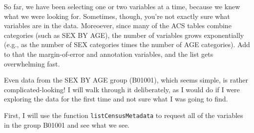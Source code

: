 \documentclass[openany]{book}
\newenvironment{Shaded}{\begin{snugshade}}{\end{snugshade}}
\newcommand{\CommentTok}[1]{\textcolor[rgb]{0.56,0.35,0.01}{\textit{#1}}}
\newcommand{\DataTypeTok}[1]{\textcolor[rgb]{0.13,0.29,0.53}{#1}}
\newcommand{\DecValTok}[1]{\textcolor[rgb]{0.00,0.00,0.81}{#1}}
\newcommand{\KeywordTok}[1]{\textcolor[rgb]{0.13,0.29,0.53}{\textbf{#1}}}
\newcommand{\NormalTok}[1]{#1}
\newcommand{\OperatorTok}[1]{\textcolor[rgb]{0.81,0.36,0.00}{\textbf{#1}}}
\newcommand{\StringTok}[1]{\textcolor[rgb]{0.31,0.60,0.02}{#1}}
\begin{document}
So far, we have been selecting one or two variables at a time, because we knew what we were looking for. Sometimes, though, you're not exactly sure what variables are in the data. Moreoever, since many of the ACS tables combine categories (such as SEX BY AGE), the number of variables grows exponentially (e.g., as the number of SEX categories times the number of AGE categories). Add to that the margin-of-error and annotation variables, and the list gets overwhelming fast.

Even data from the SEX BY AGE group (B01001), which seems simple, is rather complicated-looking! I will walk through it deliberately, as I would do if I were exploring the data for the first time and not sure what I was going to find.

First, I will use the function \texttt{listCensusMetadata} to request all of the variables in the group B01001 and see what we see.

\begin{Shaded}
\end{Shaded}
\end{document}
